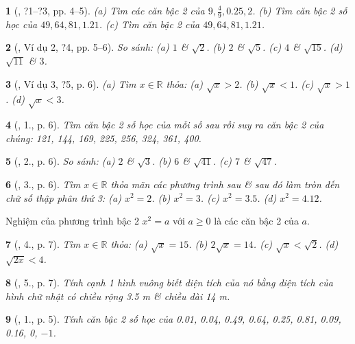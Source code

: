 \documentclass{article}
\newtheorem{baitoan}{}
\begin{document}
\begin{baitoan}[\cite{SGK_Toan_9_tap_1}, ?1--?3, pp. 4--5]
	(a) Tìm các căn bậc 2 của $9,\frac{4}{9},0.25,2$. (b) Tìm căn bậc 2 số học của $49,64,81,1.21$. (c) Tìm căn bậc 2 của $49,64,81,1.21$.
\end{baitoan}

\begin{baitoan}[\cite{SGK_Toan_9_tap_1}, Ví dụ 2, ?4, pp. 5--6]
	So sánh: (a) $1$ \& $\sqrt{2}$. (b) $2$ \& $\sqrt{5}$. (c) $4$ \& $\sqrt{15}$. (d) $\sqrt{11}$ \& $3$.
\end{baitoan}

\begin{baitoan}[\cite{SGK_Toan_9_tap_1}, Ví dụ 3, ?5, p. 6]
	(a) Tìm $x\in\mathbb{R}$ thỏa: (a) $\sqrt{x} > 2$. (b) $\sqrt{x} < 1$. (c) $\sqrt{x} > 1$. (d) $\sqrt{x} < 3$.
\end{baitoan}

\begin{baitoan}[\cite{SGK_Toan_9_tap_1}, 1., p. 6]
	Tìm căn bậc 2 số học của mỗi số sau rồi suy ra căn bậc 2 của chúng: \emph{121, 144, 169, 225, 256, 324, 361, 400}.
\end{baitoan}

\begin{baitoan}[\cite{SGK_Toan_9_tap_1}, 2., p. 6]
	So sánh: (a) $2$ \& $\sqrt{3}$. (b) $6$ \& $\sqrt{41}$. (c) $7$ \& $\sqrt{47}$.
\end{baitoan}

\begin{baitoan}[\cite{SGK_Toan_9_tap_1}, 3., p. 6]
	Tìm $x\in\mathbb{R}$ thỏa mãn các phương trình sau \& sau đó làm tròn đến chữ số thập phân thứ 3: (a) $x^2 = 2$. (b) $x^2 = 3$. (c) $x^2 = 3.5$. (d) $x^2 = 4.12$.
\end{baitoan}
 Nghiệm của phương trình bậc 2 $x^2 = a$ với $a\ge0$ là các căn bậc 2 của $a$.

\begin{baitoan}[\cite{SGK_Toan_9_tap_1}, 4., p. 7]
	Tìm $x\in\mathbb{R}$ thỏa: (a) $\sqrt{x} = 15$. (b) $2\sqrt{x} = 14$. (c) $\sqrt{x} < \sqrt{2}$. (d) $\sqrt{2x} < 4$.
\end{baitoan}

\begin{baitoan}[\cite{SGK_Toan_9_tap_1}, 5., p. 7]
	Tính cạnh 1 hình vuông biết diện tích của nó bằng diện tích của hình chữ nhật có chiều rộng \emph{3.5 m} \& chiều dài \emph{14 m}.
\end{baitoan}

\begin{baitoan}[\cite{SBT_Toan_9_tap_1}, 1., p. 5]
	Tính căn bậc 2 số học của \emph{0.01, 0.04, 0.49, 0.64, 0.25, 0.81, 0.09, 0.16, 0, $-1$.}
\end{baitoan}
\end{document}
